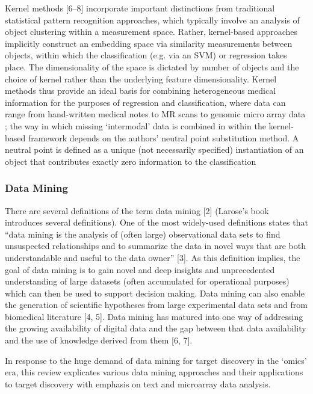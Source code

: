 \documentclass[10pt,a4paper]{article}
\begin{document}
	Kernel methods [6–8] incorporate important distinctions from traditional statistical
	pattern recognition approaches, which typically involve an analysis of
	object clustering within a measurement space. Rather, kernel-based approaches
	implicitly construct an embedding space via similarity measurements between
	objects, within which the classification (e.g. via an SVM) or regression takes
	place. The dimensionality of the space is dictated by number of objects and the
	choice of kernel rather than the underlying feature dimensionality.
	Kernel methods thus provide an ideal basis for combining heterogeneous medical
	information for the purposes of regression and classification, where data can
	range from hand-written medical notes to MR scans to genomic micro array data 
	; the way
	in which missing ‘intermodal’ data is combined in within the kernel-based framework
	depends on the authors’ neutral point substitution method. A neutral point
	is defined as a unique (not necessarily specified) instantiation of an object that
	contributes exactly zero information to the classification \cite{Windridge2014}
	
	\subsubsection{Data Mining}	
	There are several definitions of the term data mining [2] (Larose’s book introduces several definitions). One of the most widely-used definitions states that “data mining is the analysis of (often large) observational data sets to find unsuspected relationships and to summarize the data in novel ways that are both understandable and useful to the data owner” [3]. As this definition implies, the goal of data mining is to gain novel and deep insights and unprecedented understanding of large datasets (often accumulated for operational purposes) which can then be used to support decision making. Data mining can also enable the generation of scientific hypotheses from large experimental data sets and from biomedical literature [4, 5]. Data mining has matured into one way of addressing the growing availability of digital data and the gap between that data availability and the use of knowledge derived from them [6, 7]. \cite{Yoo2012}
	
	In response to the huge demand of data mining for target discovery in the ‘omics’ era, this review explicates various data mining approaches and their applications to target discovery with emphasis on text and microarray data analysis. \cite{YANG2012S16}
	
\end{document}
